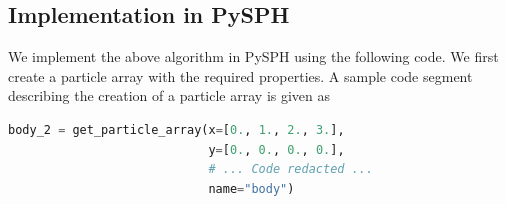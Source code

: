 \FloatBarrier%
\subsection{Implementation in PySPH}
We implement the above algorithm in PySPH using the following code. We first
create a particle array with the required properties. A sample code segment
describing the creation of a particle array is given as
 \lstset{basicstyle=\footnotesize\ttfamily}
\begin{lstlisting}[label={contact:equations},frame=lines,language=Python,upquote=True]
body_2 = get_particle_array(x=[0., 1., 2., 3.],
                            y=[0., 0., 0., 0.],
                            # ... Code redacted ...
                            name="body")
\end{lstlisting}

